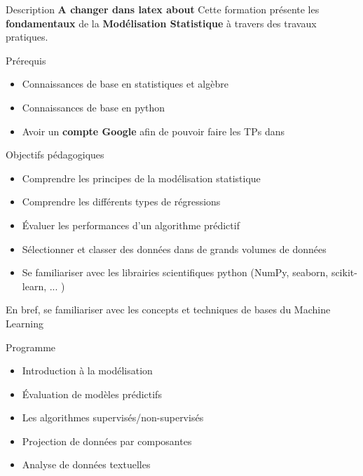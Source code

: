 \begin{frame}{Description}
  \alert{\textbf{A changer dans latex about}}
  Cette formation présente les \textbf{fondamentaux} de la \textbf{Modélisation Statistique} à travers des travaux pratiques.
\end{frame}

\begin{frame}{Prérequis}
  \begin{itemize}
  \item Connaissances de base en statistiques et algèbre
  \item Connaissances de base en python
  \item Avoir un \textbf{compte Google} afin de pouvoir faire les TPs dans 
  \end{itemize}
\end{frame}

\begin{frame}{Objectifs pédagogiques}
  \begin{itemize}
  \item Comprendre les principes de la modélisation statistique
  \item Comprendre les différents types de régressions
  \item Évaluer les performances d'un algorithme prédictif
  \item Sélectionner et classer des données dans de grands volumes de données
  \item Se familiariser avec les librairies scientifiques python (NumPy, seaborn, scikit-learn, ... )
  \end{itemize}
  En bref, se familiariser avec les concepts et techniques de bases du \og{}Machine Learning\fg
\end{frame}

\begin{frame}{Programme}
  \begin{itemize}
  \item Introduction à la modélisation
  \item Évaluation de modèles prédictifs
  \item Les algorithmes supervisés/non-supervisés
  \item Projection de données par composantes
  \item Analyse de données textuelles
  \end{itemize}
\end{frame}
